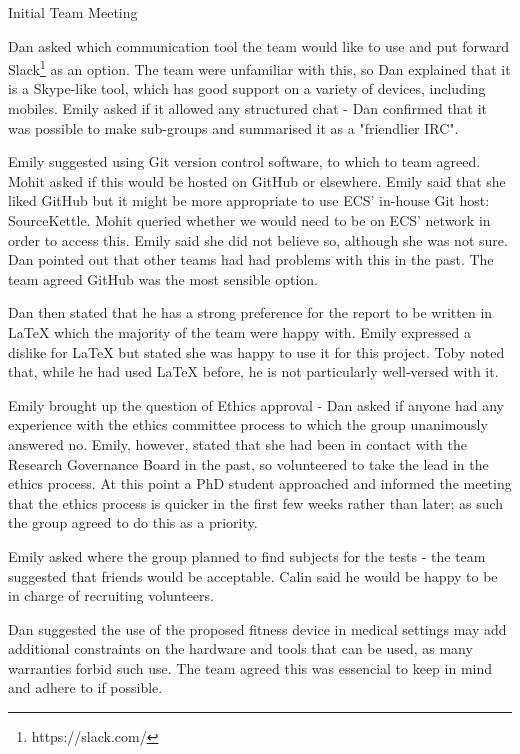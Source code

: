 \documentclass{article}
\begin{document}
\begin{Minutes}{Initial Team Meeting}

Dan asked which communication tool the team would like to use and put
forward Slack\footnote{https://slack.com/} as an option. The team were unfamiliar with this, so Dan
explained that it is a Skype-like tool, which has good support on a
variety of devices, including mobiles. Emily asked if it allowed any
structured chat - Dan confirmed that it was possible to make sub-groups
and summarised it as a "friendlier IRC".

Emily suggested using Git version control software, to which to team
agreed. Mohit asked if this would be hosted on GitHub or elsewhere. Emily
said that she liked GitHub but it might be more appropriate to use ECS'
in-house Git host: SourceKettle. Mohit queried whether we would need to be
on ECS' network in order to access this. Emily said she did not believe so,
although she was not sure. Dan pointed out that other teams had had
problems with this in the past. The team agreed GitHub was the most
sensible option.

Dan then stated that he has a strong preference for the report to be
written in LaTeX which the majority of the team were happy with. Emily expressed a dislike
for LaTeX but stated she was happy to use it for this project. Toby noted
that, while he had used LaTeX before, he is not particularly well-versed
with it.


Emily brought up the question of Ethics approval - Dan asked if anyone
had any experience with the ethics committee process to which the group
unanimously answered no. Emily, however, stated that she had been in
contact with the Research Governance Board in the past, so volunteered to
take the lead in the ethics process. At this point a PhD student
approached and informed the meeting that the ethics process is quicker in
the first few weeks rather than later; as such the group agreed to do this as a priority.

Emily asked where the group planned to find subjects for the tests
- the team suggested that friends would be acceptable. Calin said he
would be happy to be in charge of recruiting volunteers.

Dan suggested the use of the proposed fitness device in medical settings may add additional constraints on the hardware
and tools that can be used, as many warranties forbid such use. The team agreed this was essencial to keep in mind and adhere
to if possible.


\end{Minutes}
\end{document}
